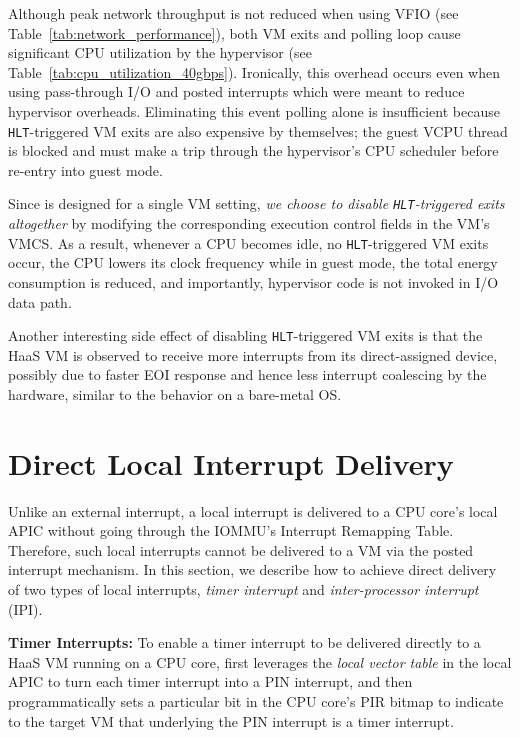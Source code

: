 Although peak network throughput is not reduced when
using VFIO (see Table~\ref{tab:network_performance}),
both VM exits and polling loop cause significant
CPU utilization by the hypervisor
(see Table~\ref{tab:cpu_utilization_40gbps}).
Ironically, this overhead occurs even when using pass-through I/O and
posted interrupts which were meant to reduce hypervisor overheads.
Eliminating this event polling alone is insufficient because {\tt HLT}-triggered VM exits
are also expensive by themselves; the guest VCPU thread is blocked and
must make a trip through the hypervisor's CPU scheduler before
re-entry into guest mode.

Since \na is designed for a single VM setting, {\em we choose to
disable {\tt HLT}-triggered exits altogether}
by modifying the corresponding execution control fields in the VM's VMCS.
As a result, whenever a CPU becomes idle, no {\tt HLT}-triggered
VM exits occur, the CPU lowers its clock frequency while in guest mode,
the total energy consumption is reduced, and importantly,
hypervisor code is not invoked in I/O data path.

Another interesting side effect of disabling {\tt HLT}-triggered VM exits
is that the HaaS VM is observed to receive more interrupts
from its direct-assigned device, possibly due to
faster EOI response and hence less interrupt coalescing by
the hardware, similar to the behavior on a bare-metal OS.

\vspace{-0.1in}
\section{Direct Local Interrupt Delivery}
\vspace{-0.05in}
\label{sec:shared_pid_dtid}

Unlike an external interrupt, a local interrupt is delivered to a CPU core's local APIC without going through the IOMMU's Interrupt Remapping Table.
Therefore, such local interrupts cannot be delivered to a VM via the posted interrupt mechanism.
In this section, we describe how to achieve direct delivery of two types of local interrupts, {\em timer interrupt} and {\em inter-processor interrupt} (IPI).

{\bf Timer Interrupts:} To enable a timer interrupt to be delivered directly to a HaaS VM running on a CPU core,
\na first leverages the {\em local vector table} in the local APIC to turn each timer interrupt into a PIN interrupt, and
then programmatically sets a particular bit in the CPU core's PIR bitmap to indicate to the target VM that underlying the PIN interrupt is a timer interrupt.

